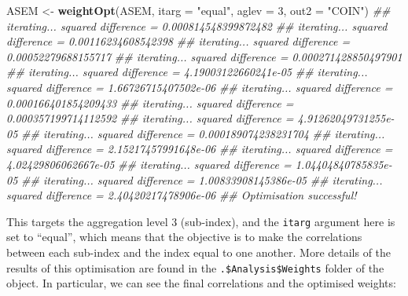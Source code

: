 \documentclass[
]{book}
\newenvironment{Shaded}{\begin{snugshade}}{\end{snugshade}}
\newcommand{\CommentTok}[1]{\textcolor[rgb]{0.56,0.35,0.01}{\textit{#1}}}
\newcommand{\DataTypeTok}[1]{\textcolor[rgb]{0.13,0.29,0.53}{#1}}
\newcommand{\DecValTok}[1]{\textcolor[rgb]{0.00,0.00,0.81}{#1}}
\newcommand{\KeywordTok}[1]{\textcolor[rgb]{0.13,0.29,0.53}{\textbf{#1}}}
\newcommand{\NormalTok}[1]{#1}
\newcommand{\OperatorTok}[1]{\textcolor[rgb]{0.81,0.36,0.00}{\textbf{#1}}}
\newcommand{\StringTok}[1]{\textcolor[rgb]{0.31,0.60,0.02}{#1}}
\begin{document}
\begin{Shaded}
\begin{Highlighting}[]

\NormalTok{ASEM <-}\StringTok{ }\KeywordTok{weightOpt}\NormalTok{(ASEM, }\DataTypeTok{itarg =} \StringTok{"equal"}\NormalTok{, }\DataTypeTok{aglev =} \DecValTok{3}\NormalTok{, }\DataTypeTok{out2 =} \StringTok{"COIN"}\NormalTok{)}
\CommentTok{## iterating... squared difference = 0.000814548399872482}
\CommentTok{## iterating... squared difference = 0.00116234608542398}
\CommentTok{## iterating... squared difference = 0.00052279688155717}
\CommentTok{## iterating... squared difference = 0.000271428850497901}
\CommentTok{## iterating... squared difference = 4.19003122660241e-05}
\CommentTok{## iterating... squared difference = 1.66726715407502e-06}
\CommentTok{## iterating... squared difference = 0.000166401854209433}
\CommentTok{## iterating... squared difference = 0.000357199714112592}
\CommentTok{## iterating... squared difference = 4.91262049731255e-05}
\CommentTok{## iterating... squared difference = 0.000189074238231704}
\CommentTok{## iterating... squared difference = 2.15217457991648e-06}
\CommentTok{## iterating... squared difference = 4.02429806062667e-05}
\CommentTok{## iterating... squared difference = 1.04404840785835e-05}
\CommentTok{## iterating... squared difference = 1.00833908145386e-05}
\CommentTok{## iterating... squared difference = 2.40420217478906e-06}
\CommentTok{## Optimisation successful!}
\end{Highlighting}
\end{Shaded}

This targets the aggregation level 3 (sub-index), and the \texttt{itarg} argument here is set to ``equal'', which means that the objective is to make the correlations between each sub-index and the index equal to one another. More details of the results of this optimisation are found in the \texttt{.\$Analysis\$Weights} folder of the object. In particular, we can see the final correlations and the optimised weights:

\begin{Shaded}
\end{Shaded}
\end{document}
